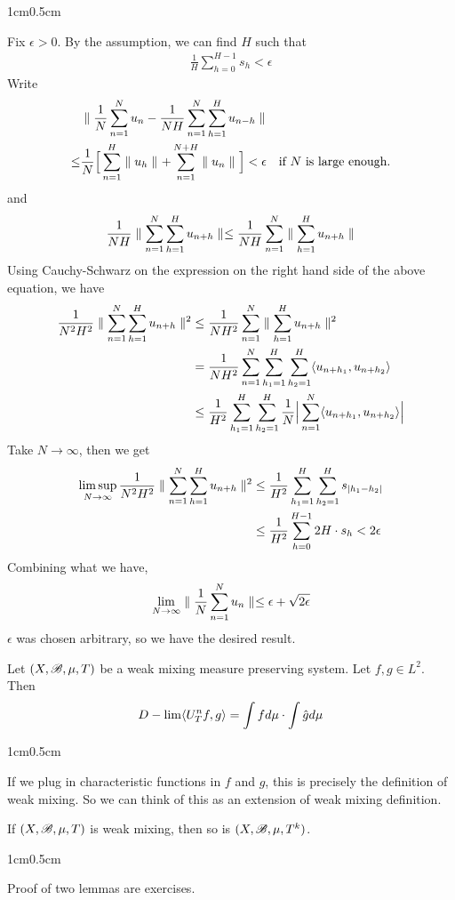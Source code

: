 \documentclass[10pt,a4paper]{report}
\newenvironment{proof}
{\begin{changemargin}{1cm}{0.5cm} 
	}%
	{\end{changemargin}
}
\begin{document}
\begin{proof}
\pf Fix $\epsilon >0$. By the assumption, we can find $H$ such that
\begin{align*}
\frac{1}{H} \sum_{h=0}^{H-1} s_h <\epsilon
\end{align*}
Write
\begin{align*}
& \parallel \frac{1}{N} \sum_{n=1}^N u_n - \frac{1}{NH} \sum_{n=1}^N \sum_{h=1}^H u_{n-h}  \parallel_{} \\ 
\leq &\frac{1}{N} \Big[ \sum_{n=1}^H \parallel u_h \parallel_{} + \sum_{n=1}^{N+H} \parallel u_n \parallel_{} \Big] < \epsilon \quad \text{if $N$ is large enough.}
\end{align*}
and
\begin{align*}
\frac{1}{NH} \parallel \sum_{n=1}^N \sum_{h=1}^H u_{n+h} \parallel_{} \leq \frac{1}{NH} \sum_{n=1}^N \parallel \sum_{h=1}^H u_{n+h} \parallel_{}
\end{align*}
Using Cauchy-Schwarz on the expression on the right hand side of the above equation, we have
\begin{align*}
\frac{1}{N^2 H^2} \parallel \sum_{n=1}^N \sum_{h=1}^H u_{n+h} \parallel_{}^2 &\leq \frac{1}{N H^2} \sum_{n=1}^N \parallel \sum_{h=1}^H u_{n+h} \parallel_{}^2 \\
& = \frac{1}{NH^2} \sum_{n=1}^N \sum_{h_1=1}^H \sum_{h_2 =1}^H \langle u_{n+h_1}, u_{n+h_2} \rangle \\
& \leq \frac{1}{H^2} \sum_{h_1=1}^H \sum_{h_2 =1}^H \frac{1}{N} \Big| \sum_{n=1}^N \langle u_{n+h_1} , u_{n+h_2} \rangle  \Big|
\end{align*}
Take $N\rightarrow \infty$, then we get
\begin{align*}
\limsup_{N \rightarrow \infty} \frac{1}{N^2 H^2} \parallel \sum_{n=1}^N \sum_{h=1}^H u_{n+h} \parallel_{}^2 &\leq \frac{1}{H^2} \sum_{h_1 =1}^H \sum_{h_2=1}^H s_{|h_1 - h_2|} \\
&\leq \frac{1}{H^2} \sum_{h=0}^{H-1} 2H \cdot s_h < 2\epsilon
\end{align*}
Combining what we have,
\begin{align*}
\lim_{N\rightarrow \infty} \parallel \frac{1}{N} \sum_{n=1}^N u_n \parallel_{} \leq \epsilon + \sqrt{2\epsilon}
\end{align*}
$\epsilon$ was chosen arbitrary, so we have the desired result.

\eop
\end{proof}
\s

\lem Let $(X,\mathscr{B}, \mu, T)$ be a weak mixing measure preserving system. Let $f,g\in L^2$. Then
\begin{align*}
D-\lim \langle U^n_T f,g\rangle = \int f d\mu \cdot \int \hat{g} d\mu 
\end{align*}
\begin{proof}
If we plug in characteristic functions in $f$ and $g$, this is precisely the definition of weak mixing. So we can think of this as an extension of weak mixing definition.
\end{proof}

\lem If $(X,\mathscr{B}, \mu, T)$ is weak mixing, then so is $(X,\mathscr{B}, \mu, T^k)$.
\begin{proof}
\pf Proof of two lemmas are exercises.
\end{proof}
\s
\end{document}
